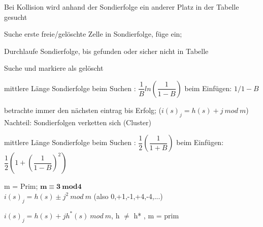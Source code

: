 Bei Kollision wird anhand der Sondierfolge ein anderer Platz in der Tabelle gesucht

Suche erste freie/gelöschte Zelle in Sondierfolge, füge ein;

Durchlaufe Sondierfolge, bis gefunden oder sicher nicht in Tabelle 

 Suche und markiere als gelöscht

mittlere Länge Sondierfolge beim Suchen : $\dfrac{1}{B}ln\left(\dfrac{1}{1-B}\right)$
beim Einfügen: $1/1-B$

betrachte immer den nächsten eintrag bis Erfolg; ($i(s)_j=h(s)+j~mod~m$)\\
Nachteil: Sondierfolgen verketten sich (Cluster)

mittlere Länge Sondierfolge beim Suchen : $\dfrac{1}{2}\left(\dfrac{1}{1+B}\right)$
beim Einfügen:  $\dfrac{1}{2}\left(1+\left(\dfrac{1}{1-B}\right)^2\right)$

m = Prim; $\mathbf{m \equiv 3 ~mod 4}$ \\
$i(s)_j = h(s) \pm j^2~mod~m$ (also 0,+1,-1,+4,-4,...) 

$i(s)_j = h(s) + jh^*(s)~ mod~ m$,  h $\neq$ h* , m = prim

